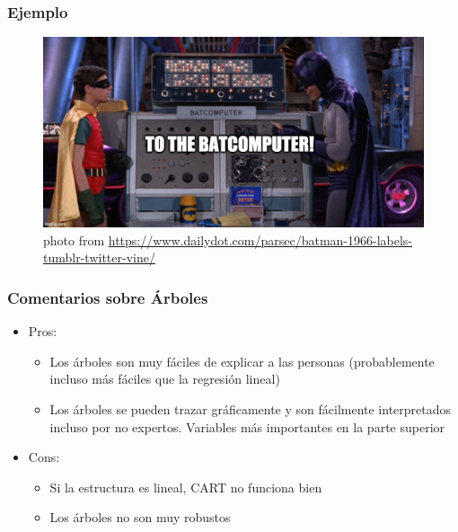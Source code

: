 \documentclass[
  shownotes,
  xcolor={svgnames},
  hyperref={colorlinks,citecolor=DarkBlue,linkcolor=andesred,urlcolor=DarkBlue}
  , aspectratio=169]{beamer}
\begin{document}
\begin{frame}[fragile]
\frametitle{Ejemplo}
\begin{figure}[H] \centering
  \centering
  \includegraphics[scale=0.35]{figures/baticomputer_meme.jpg}
  \\
  \tiny photo from \url{https://www.dailydot.com/parsec/batman-1966-labels-tumblr-twitter-vine/}
\end{figure}

\end{frame}


\begin{frame}[fragile]
\frametitle{Comentarios sobre Árboles}

\begin{itemize}
\item Pros: 
  \begin{itemize}
    \item Los árboles son muy fáciles de explicar a las personas (probablemente incluso más fáciles que la regresión lineal)
    \medskip
    \item Los árboles se pueden trazar gráficamente y son fácilmente interpretados incluso por no expertos. Variables más importantes en la parte superior
  \end{itemize}

\bigskip
\item  Cons:
  \begin{itemize}
    
    \item Si la estructura es lineal, CART no funciona bien
    \medskip
    \item Los árboles no son muy robustos 
    
  \end{itemize}
\end{itemize}

\end{frame}
\end{document}
